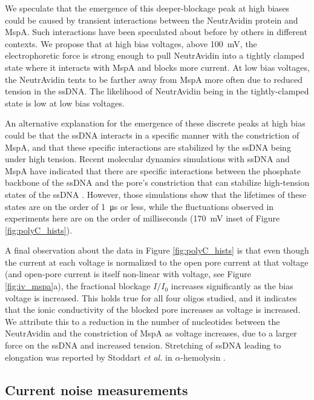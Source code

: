 We speculate that the emergence of this deeper-blockage peak at high biases could be caused by transient interactions between the NeutrAvidin protein and MspA.  Such interactions have been speculated about before by others \citep{Manrao2011} in different contexts.  We propose that at high bias voltages, above \SI{100}{\mV}, the electrophoretic force is strong enough to pull NeutrAvidin into a tightly clamped state where it interacts with MspA and blocks more current.  At low bias voltages, the NeutrAvidin tents to be farther away from MspA more often due to reduced tension in the ssDNA.  The likelihood of NeutrAvidin being in the tightly-clamped state is low at low bias voltages.

An alternative explanation for the emergence of these discrete peaks at high bias could be that the ssDNA interacts in a specific manner with the constriction of MspA, and that these specific interactions are stabilized by the ssDNA being under high tension.  Recent molecular dynamics simulations with ssDNA and MspA have indicated that there are specific interactions between the phosphate backbone of the ssDNA and the pore's constriction that can stabilize high-tension states of the ssDNA \citep{Bhattacharya2016a}.  However, those simulations show that the lifetimes of these states are on the order of \SI{1}{\micro\s} or less, while the fluctuations observed in experiments here are on the order of milliseconds (\SI{170}{\mV} inset of Figure \ref{fig:polyC_hists}).

A final observation about the data in Figure \ref{fig:polyC_hists} is that even though the current at each voltage is normalized to the open pore current at that voltage (and open-pore current is itself non-linear with voltage, see Figure \ref{fig:iv_mspa}a), the fractional blockage $I/I_0$ increases significantly as the bias voltage is increased.  This holds true for all four oligos studied, and it indicates that the ionic conductivity of the blocked pore increases as voltage is increased.  We attribute this to a reduction in the number of nucleotides between the NeutrAvidin and the constriction of MspA as voltage increases, due to a larger force on the ssDNA and increased tension.  Stretching of ssDNA leading to elongation was reported by Stoddart \textit{et al.} in $\alpha$-hemolysin \citep{Stoddart2015}.

\subsection{Current noise measurements}

